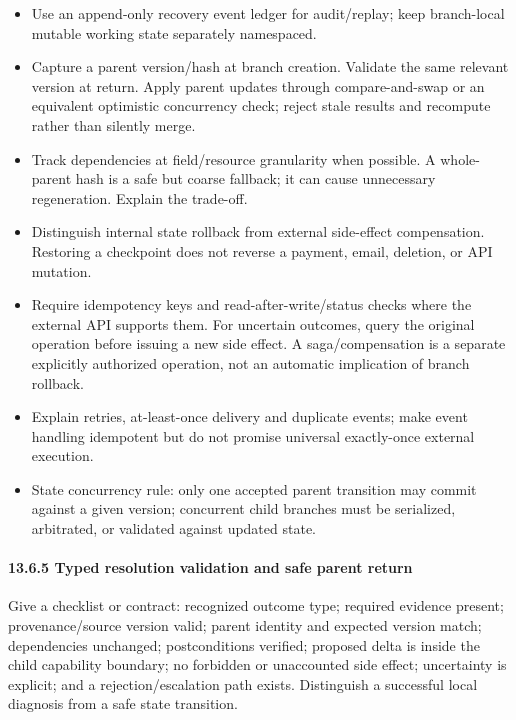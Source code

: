 \begin{itemize}
\tightlist
\item
  Use an append-only recovery event ledger for audit/replay; keep branch-local mutable working state separately namespaced.
\item
  Capture a parent version/hash at branch creation. Validate the same relevant version at return. Apply parent updates through compare-and-swap or an equivalent optimistic concurrency check; reject stale results and recompute rather than silently merge.
\item
  Track dependencies at field/resource granularity when possible. A whole-parent hash is a safe but coarse fallback; it can cause unnecessary regeneration. Explain the trade-off.
\item
  Distinguish internal state rollback from external side-effect compensation. Restoring a checkpoint does not reverse a payment, email, deletion, or API mutation.
\item
  Require idempotency keys and read-after-write/status checks where the external API supports them. For uncertain outcomes, query the original operation before issuing a new side effect. A saga/compensation is a separate explicitly authorized operation, not an automatic implication of branch rollback.
\item
  Explain retries, at-least-once delivery and duplicate events; make event handling idempotent but do not promise universal exactly-once external execution.
\item
  State concurrency rule: only one accepted parent transition may commit against a given version; concurrent child branches must be serialized, arbitrated, or validated against updated state.
\end{itemize}

\paragraph{13.6.5 Typed resolution validation and safe parent return}\label{1365-typed-resolution-validation-and-safe-parent-return}

Give a checklist or contract: recognized outcome type; required evidence present; provenance/source version valid; parent identity and expected version match; dependencies unchanged; postconditions verified; proposed delta is inside the child capability boundary; no forbidden or unaccounted side effect; uncertainty is explicit; and a rejection/escalation path exists. Distinguish a successful local diagnosis from a safe state transition.

